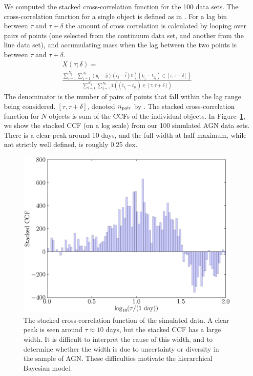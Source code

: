 \documentclass[useAMS,usenatbib]{mn2e}
\begin{document}
We computed the stacked cross-correlation function for the 100 data sets.
The cross-correlation function for a single object is defined as
in \citet{2012MNRAS.427.2701F}. For a lag bin between $\tau$ and $\tau + \delta$
the amount of cross correlation is calculated by looping over pairs of points
(one selected from the continuum data set, and another from the line data set),
and accumulating mass when the lag between the two points is between $\tau$
and $\tau + \delta$.
\begin{eqnarray}
X(\tau; \delta) =\\ \frac{\sum_{i=1}^{N_y}\sum_{j=1}^{N_l}
\left(y_i - \bar{y}\right)
\left(l_j - \bar{l}\right)
\mathds{1}\left((t_{l_j} - t_{y_i}) \in [\tau, \tau + \delta]\right)}
{\sum_{i=1}^{N_y}\sum_{j=1}^{N_l}
\mathds{1}\left((t_{l_j} - t_{y_i}) \in [\tau, \tau + \delta]\right)}
\end{eqnarray}
The denominator is the number of pairs of points that fall within the lag range
being considered, $[\tau, \tau + \delta]$, denoted $n_{\rm pair}$ by
\citet{2012MNRAS.427.2701F}.
The stacked cross-correlation function for $N$ objects is sum of the CCFs
of the individual objects. In Figure~\ref{fig:ccf}, we show the stacked CCF
(on a log scale) from our 100 simulated AGN data sets.
There is a clear peak around 10 days, and the full width at half maximum,
while not strictly well defined, is roughly 0.25 dex.

\begin{figure}
\begin{center}
\includegraphics[scale=0.4]{Figures/ccf.eps}
\caption{The stacked cross-correlation function of the simulated data.
A clear peak is seen around $\tau \approx 10$ days, but the stacked CCF has a
large width. It is difficult to interpret the cause of this width, and to
determine whether the width is due to uncertainty or diversity in the sample
of AGN. These difficulties motivate the hierarchical Bayesian model.
\label{fig:ccf}}
\end{center}
\end{figure}
\end{document}
